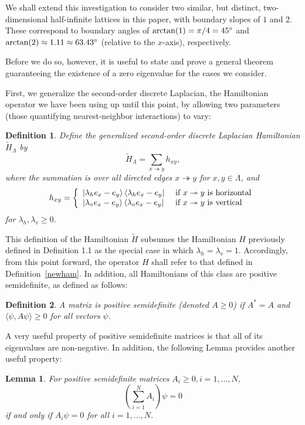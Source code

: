 \documentclass{article}
\newtheorem{lemma}{Lemma}
\newtheorem{definition}{Definition}
\newcommand{\xyedge}{x \twoheadrightarrow y}
\numberwithin{equation}{section}
\numberwithin{theorem}{section}
\numberwithin{proposition}{section}
\numberwithin{lemma}{section}
\numberwithin{corollary}{section}
\numberwithin{definition}{section}
\begin{document}
We shall extend this investigation to consider two similar, but distinct, two-dimensional half-infinite lattices in this paper, with boundary slopes of $1$ and $2$. These correspond to boundary angles of $\arctan (1) = \pi/4 = 45\degree$ and $\arctan (2) \approx 1.11 \approx 63.43 \degree$ (relative to the $x$-axis), respectively.

Before we do so, however, it is useful to state and prove a general theorem guaranteeing the existence of a zero eigenvalue for the cases we consider.

First, we generalize the second-order discrete Laplacian, the Hamiltonian operator we have been using up until this point, by allowing two parameters (those quantifying nearest-neighbor interactions) to vary:

\begin{definition}
Define the generalized second-order discrete Laplacian Hamiltonian $\tilde{H}_\Lambda$ by
\[
\tilde{H}_\Lambda = \sum_{x \twoheadrightarrow y} h_{xy},
\]
where the summation is over all directed edges $\xyedge$ for $x,y \in \Lambda$, and
\[
\label{newham}
h_{xy} = \left\{
	\begin{array}{ll}
		\Ket{ \lambda_h e_x - e_y } \Bra { \lambda_h e_x - e_y } & \textnormal{ if } \xyedge \textnormal{ is horizontal} \\
		\Ket{ \lambda_v e_x - e_y } \Bra { \lambda_v e_x - e_y } & \textnormal{ if } \xyedge \textnormal{ is vertical}
	\end{array}
	\right.
\]
for $\lambda_h, \lambda_v \geq 0$.
\end{definition}

This definition of the Hamiltonian $\tilde{H}$ subsumes the Hamiltonian $H$ previously defined in Definition 1.1 as the special case in which $\lambda_h = \lambda_v = 1$. Accordingly, from this point forward, the operator $H$ shall refer to that defined in Definition~\ref{newham}. In addition, all Hamiltonians of this class are positive semidefinite, as defined as follows:

\begin{definition}
A matrix is positive semidefinite (denoted $A \geq 0$) if $A^* = A$ and $\langle \psi, A \psi \rangle \geq 0$ for all vectors $\psi$.
\end{definition}

A very useful property of positive semidefinite matrices is that all of its eigenvalues are non-negative. In addition, the following Lemma provides another useful property:
\begin{lemma}
For positive semidefinite matrices $A_i \geq 0, i = 1, ..., N$,
\[
\left(\sum_{i = 1}^N A_i\right) \psi = 0 
\]
if and only if $A_i \psi = 0$ for all $ i = 1, ..., N$.
\end{lemma}
\end{document}
